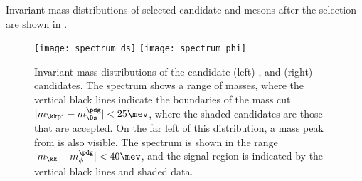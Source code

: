Invariant mass distributions of
selected candidate \Ds and \phii mesons after the selection are shown in .

\begin{figure}
  \begin{center}
    \texttt{[image: spectrum\_ds]}
    \texttt{[image: spectrum\_phi]}
    \caption[Selected \Ds and \phii candidates]
    {
      Invariant mass distributions of the candidate
      (left) \decay{\Ds}{\kkpi}, and
      (right) \decay{\phii}{\kk} candidates.
      The \kkpi spectrum shows a range of masses, where the vertical black lines indicate the
      boundaries of the mass cut $|m_{\kkpi}-m_{\Ds}^\pdg|<25\mev$, where the shaded candidates are
      those that are accepted.
      On the far left of this distribution, a mass peak from \decay{\Dp}{\kkpi} is also visible.
      The \decay{\phi}{\kk} spectrum is shown in the range $|m_{\kk}-m_{\phi}^\pdg|<40\mev$,
      and the signal region is indicated by the vertical black lines and shaded data.
    }
    \label{fig:dsphi:mesons}
  \end{center}
\end{figure}

